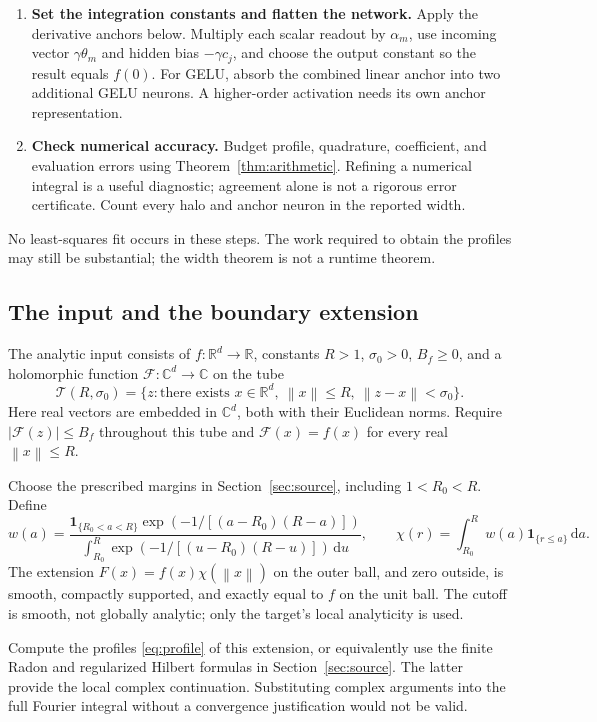 \documentclass[11pt,letterpaper]{article}
\newcommand{\R}{\mathbb R}
\newcommand{\C}{\mathbb C}
\newcommand{\dd}{\,\mathrm d}
\newcommand{\norm}[1]{\left\lVert#1\right\rVert}
\theoremstyle{definition}
\theoremstyle{remark}
\begin{document}
\begin{enumerate}
\item \textbf{Set the integration constants and flatten the network.}
Apply the derivative anchors below. Multiply each scalar readout by
\(\alpha_m\), use incoming vector \(\gamma\theta_m\) and hidden bias
\(-\gamma c_j\), and choose the output constant so the result equals \(f(0)\).
For GELU, absorb the combined linear anchor into two additional GELU neurons.
A higher-order activation needs its own anchor representation.
\item \textbf{Check numerical accuracy.} Budget profile, quadrature, coefficient,
and evaluation errors using Theorem~\ref{thm:arithmetic}. Refining a numerical
integral is a useful diagnostic; agreement alone is not a rigorous error
certificate. Count every halo and anchor neuron in the reported width.
\end{enumerate}
No least-squares fit occurs in these steps. The work required to obtain the
profiles may still be substantial; the width theorem is not a runtime theorem.

\subsection{The input and the boundary extension}\label{sec:target-input}
The analytic input consists of \(f:\R^d\to\R\), constants \(R>1\),
\(\sigma_0>0\), \(B_f\ge0\), and a holomorphic function
\(\mathcal F:\C^d\to\C\) on the tube
\[
 \mathcal T(R,\sigma_0)
 =\{z:\text{there exists }x\in\R^d,\ \norm{x}\le R,\
                      \norm{z-x}<\sigma_0\}.
\]
Here real vectors are embedded in \(\C^d\), both with their Euclidean norms.
Require \(|\mathcal F(z)|\le B_f\) throughout this tube and
\(\mathcal F(x)=f(x)\) for every real \(\norm{x}\le R\).

Choose the prescribed margins in Section~\ref{sec:source}, including
\(1<R_0<R\). Define
\[
 w(a)=
 \frac{\mathbf 1_{\{R_0<a<R\}}
       \exp(-1/[(a-R_0)(R-a)])}
      {\int_{R_0}^{R}\exp(-1/[(u-R_0)(R-u)])\dd u},
 \qquad
 \chi(r)=\int_{R_0}^{R}w(a)\mathbf 1_{\{r\le a\}}\dd a .
\]
The extension \(F(x)=f(x)\chi(\norm{x})\) on the outer ball, and zero outside,
is smooth, compactly supported, and exactly equal to \(f\) on the unit ball.
The cutoff is smooth, not globally analytic; only the target's local
analyticity is used.

Compute the profiles \eqref{eq:profile} of this extension, or equivalently use
the finite Radon and regularized Hilbert formulas in
Section~\ref{sec:source}. The latter provide the local complex continuation.
Substituting complex arguments into the full Fourier integral without a
convergence justification would not be valid.
\end{document}
